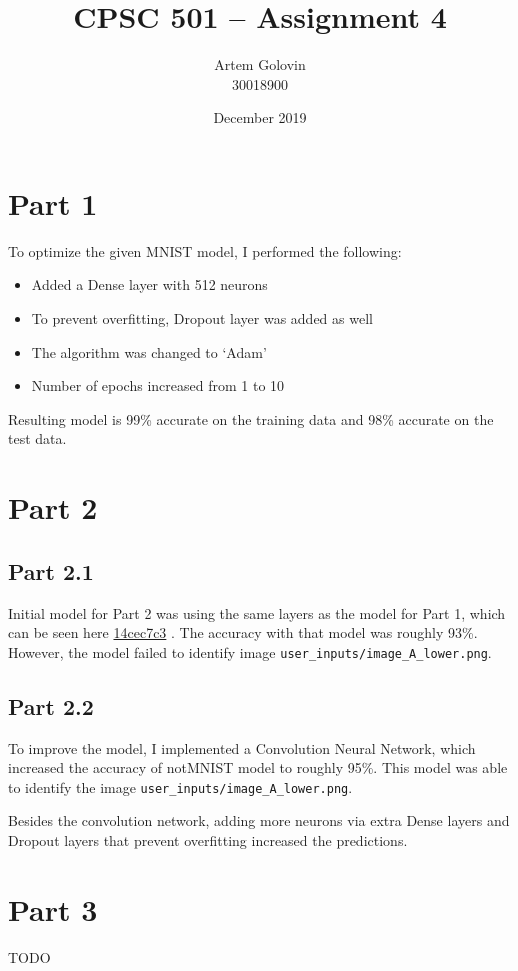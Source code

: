 \documentclass{article}
\title{CPSC 501 -- Assignment 4}
\author{Artem Golovin \\ 30018900}
\date{December 2019}
\newcommand{\gh}[1]{%
  \href{https://github.com/awave1/cpsc501-tensorflow/commit/#1}{#1}%
}
\begin{document}
\maketitle

\section*{Part 1}

To optimize the given MNIST model, I performed the following:

\begin{itemize}
  \item Added a Dense layer with 512 neurons
  \item To prevent overfitting, Dropout layer was added as well
  \item The algorithm was changed to `Adam'
  \item Number of epochs increased from 1 to 10
\end{itemize}

Resulting model is 99\% accurate on the training data and 98\% accurate on the test data.

\section*{Part 2}

\subsection*{Part 2.1}

Initial model for Part 2 was using the same layers as the model for Part 1, which can be seen here \gh{14cec7c3}. The accuracy with that model was roughly 93\%. However, the model failed to identify image \texttt{user_inputs/image_A_lower.png}.

\subsection*{Part 2.2}

To improve the model, I implemented a Convolution Neural Network, which increased the accuracy of notMNIST model to roughly 95\%. This model was able to identify the image \texttt{user_inputs/image_A_lower.png}.

Besides the convolution network, adding more neurons via extra Dense layers and Dropout layers that prevent overfitting increased the predictions.

\section*{Part 3}

TODO
\end{document}
